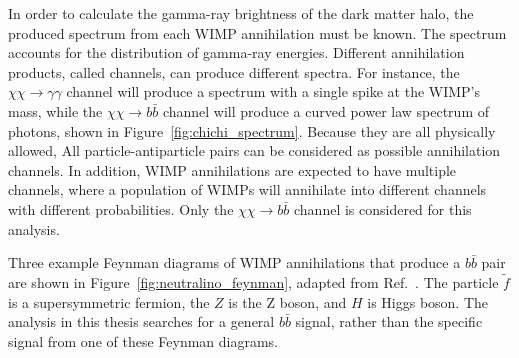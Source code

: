     
    
    
    In order to calculate the gamma-ray brightness of the dark matter halo, the produced spectrum from each WIMP annihilation must be known.
    The spectrum accounts for the distribution of gamma-ray energies.
    Different annihilation products, called channels, can produce different spectra.
    For instance, the $\chi\chi \rightarrow \gamma\gamma$ channel will produce a spectrum with a single spike at the WIMP's mass, while the $\chi\chi \rightarrow b\bar{b}$ channel will produce a curved power law spectrum of photons, shown in Figure~\ref{fig:chichi_spectrum}.
    Because they are all physically allowed, All particle-antiparticle pairs can be considered as possible annihilation channels.
    In addition, WIMP annihilations are expected to have multiple channels, where a population of WIMPs will annihilate into different channels with different probabilities.
    Only the $\chi\chi \rightarrow b\bar{b}$ channel is considered for this analysis.
    
    Three example Feynman diagrams of WIMP annihilations that produce a $b\bar{b}$ pair are shown in Figure~\ref{fig:neutralino_feynman}, adapted from Ref.~\cite{Jungman:1995df}.
    The particle $\tilde{f}$ is a supersymmetric fermion, the $Z$ is the Z boson, and $H$ is Higgs boson.
    The analysis in this thesis searches for a general $b\bar{b}$ signal, rather than the specific signal from one of these Feynman diagrams.
    
